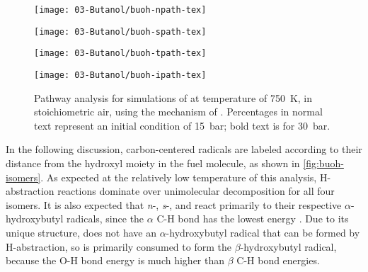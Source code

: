 \documentclass[../main.tex]{subfiles}
\begin{document}
\begin{figure}
    \begin{floatrow}
    \ffigbox
        {\texttt{[image: 03-Butanol/buoh-npath-tex]}}
        {\caption{Pathway analysis for simulations of \nBuOH{} at
            temperature of \SI{750}{\kelvin}, in stoichiometric air, using the mechanism of
            \textcite{Sarathy2012}. Percentages in normal text represent an
            initial condition of \SI{15}{\bar}; bold text is for \SI{30}{\bar}.}
        \label{fig:buoh-npath}}
    \ffigbox
        {\texttt{[image: 03-Butanol/buoh-spath-tex]}}
        {\caption{Pathway analysis for simulations of \sBuOH{} at
            temperature of \SI{750}{\kelvin}, in stoichiometric air, using the mechanism of
            \textcite{Sarathy2012}. Percentages in normal text represent an
            initial condition of \SI{15}{\bar}; bold text is for \SI{30}{\bar}.}
        \label{fig:buoh-spath}}
    \end{floatrow}
    \par
    \begin{floatrow}
    \ffigbox
        {\texttt{[image: 03-Butanol/buoh-tpath-tex]}}
        {\caption{Pathway analysis for simulations of \tBuOH{} at
            temperature of \SI{750}{\kelvin}, in stoichiometric air, using the mechanism of
            \textcite{Sarathy2012}. Percentages in normal text represent an
            initial condition of \SI{15}{\bar}; bold text is for \SI{30}{\bar}.}
        \label{fig:buoh-tpath}}
    \ffigbox
        {\texttt{[image: 03-Butanol/buoh-ipath-tex]}}
        {\caption{Pathway analysis for simulations of \iBuOH{} at
            temperature of \SI{750}{\kelvin}, in stoichiometric air, using the mechanism of
            \textcite{Sarathy2012}. Percentages in normal text represent an
            initial condition of \SI{15}{\bar}; bold text is for \SI{30}{\bar}.}
        \label{fig:buoh-ipath}}
    \end{floatrow}
\end{figure}

In the following discussion, carbon-centered radicals are labeled according to
their distance from the hydroxyl moiety in the fuel molecule, as shown in
\cref{fig:buoh-isomers}. As expected at the relatively low temperature of this analysis, H-abstraction
reactions dominate over unimolecular decomposition for all four isomers. It is
also expected that \textit{n}-, \textit{s}-, and \iBuOH{} react
primarily to their respective $\alpha$-hydroxybutyl radicals, since the
$\alpha$ C-H bond has the lowest energy \cite{Sarathy2012}. Due to its unique
structure, \tBuOH{} does not have an $\alpha$-hydroxybutyl radical
that can be formed by H-abstraction, so \tBuOH{} is primarily
consumed to form the $\beta$-hydroxybutyl radical, because the O-H bond energy
is much higher than $\beta$ C-H bond energies.
\end{document}
